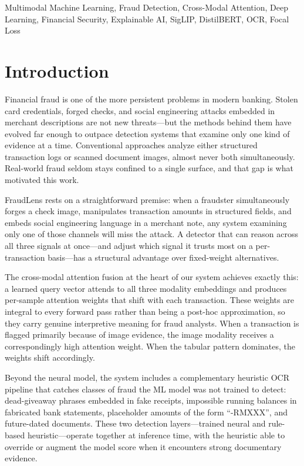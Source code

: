 \documentclass[10pt,conference,letterpaper]{IEEEtran}
\begin{document}
\begin{IEEEkeywords}
Multimodal Machine Learning, Fraud Detection, Cross-Modal Attention, Deep Learning,
Financial Security, Explainable AI, SigLIP, DistilBERT, OCR, Focal Loss
\end{IEEEkeywords}

\section{Introduction}

Financial fraud is one of the more persistent problems in modern banking. Stolen card
credentials, forged checks, and social engineering attacks embedded in merchant
descriptions are not new threats---but the methods behind them have evolved far enough
to outpace detection systems that examine only one kind of evidence at a time.
Conventional approaches analyze either structured transaction logs or scanned document
images, almost never both simultaneously. Real-world fraud seldom stays confined to a
single surface, and that gap is what motivated this work.

FraudLens rests on a straightforward premise: when a fraudster simultaneously forges a
check image, manipulates transaction amounts in structured fields, and embeds social
engineering language in a merchant note, any system examining only one of those channels
will miss the attack. A detector that can reason across all three signals at once---and
adjust which signal it trusts most on a per-transaction basis---has a structural
advantage over fixed-weight alternatives.

The cross-modal attention fusion at the heart of our system achieves exactly this: a
learned query vector attends to all three modality embeddings and produces
per-sample attention weights that shift with each transaction. These weights are integral
to every forward pass rather than being a post-hoc approximation, so they carry genuine
interpretive meaning for fraud analysts. When a transaction is flagged primarily because
of image evidence, the image modality receives a correspondingly high attention weight.
When the tabular pattern dominates, the weights shift accordingly.

Beyond the neural model, the system includes a complementary heuristic OCR pipeline that
catches classes of fraud the ML model was not trained to detect: dead-giveaway phrases
embedded in fake receipts, impossible running balances in fabricated bank statements,
placeholder amounts of the form ``-RMXXX'', and future-dated documents. These two
detection layers---trained neural and rule-based heuristic---operate together at
inference time, with the heuristic able to override or augment the model score when it
encounters strong documentary evidence.
\end{document}
